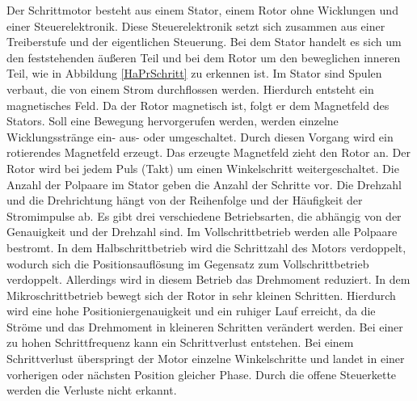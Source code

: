 Der Schrittmotor besteht aus einem Stator, einem Rotor ohne Wicklungen und einer Steuerelektronik. Diese Steuerelektronik setzt sich zusammen aus einer Treiberstufe und der eigentlichen Steuerung. Bei dem Stator handelt es sich um den feststehenden äußeren Teil und bei dem Rotor um den beweglichen inneren Teil, wie in Abbildung \ref{HaPrSchritt} zu erkennen ist. Im Stator sind Spulen verbaut, die von einem Strom durchflossen werden. Hierdurch entsteht ein magnetisches Feld. Da der Rotor magnetisch ist, folgt er dem Magnetfeld des Stators. Soll eine Bewegung hervorgerufen werden, werden einzelne Wicklungsstränge ein- aus- oder umgeschaltet. Durch diesen Vorgang wird ein rotierendes Magnetfeld erzeugt. Das erzeugte Magnetfeld zieht den Rotor an. Der Rotor wird bei jedem Puls (Takt) um einen Winkelschritt weitergeschaltet. Die Anzahl der Polpaare im Stator geben die Anzahl der Schritte vor. Die Drehzahl und die Drehrichtung hängt von der Reihenfolge und der Häufigkeit der Stromimpulse ab. Es gibt drei verschiedene Betriebsarten, die abhängig von der Genauigkeit und der Drehzahl sind. Im Vollschrittbetrieb werden alle Polpaare bestromt. In dem Halbschrittbetrieb wird die Schrittzahl des Motors verdoppelt, wodurch sich die Positionsauflösung im Gegensatz zum Vollschrittbetrieb verdoppelt. Allerdings wird in diesem Betrieb das Drehmoment reduziert. In dem Mikroschrittbetrieb bewegt sich der Rotor in sehr kleinen Schritten. Hierdurch wird eine hohe Positioniergenauigkeit und ein ruhiger Lauf erreicht, da die Ströme und das Drehmoment in kleineren Schritten verändert werden. Bei einer zu hohen Schrittfrequenz kann ein Schrittverlust entstehen. Bei einem Schrittverlust überspringt der Motor einzelne Winkelschritte und landet in einer vorherigen oder nächsten Position gleicher Phase. Durch die offene Steuerkette werden die Verluste nicht erkannt.    \cite{Hagl.2021}\cite{Bernstein.2018}\cite{Schroder.2021}

